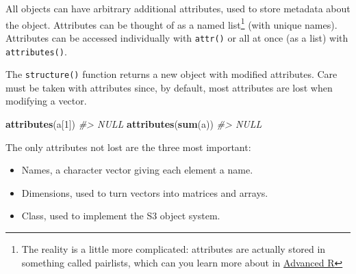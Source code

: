 \documentclass[]{book}
\newenvironment{Shaded}{\begin{snugshade}}{\end{snugshade}}
\newcommand{\KeywordTok}[1]{\textcolor[rgb]{0.13,0.29,0.53}{\textbf{#1}}}
\newcommand{\DecValTok}[1]{\textcolor[rgb]{0.00,0.00,0.81}{#1}}
\newcommand{\StringTok}[1]{\textcolor[rgb]{0.31,0.60,0.02}{#1}}
\newcommand{\CommentTok}[1]{\textcolor[rgb]{0.56,0.35,0.01}{\textit{#1}}}
\newcommand{\OperatorTok}[1]{\textcolor[rgb]{0.81,0.36,0.00}{\textbf{#1}}}
\newcommand{\NormalTok}[1]{#1}
\let\rmarkdownfootnote\footnote%
\def\footnote{\protect\rmarkdownfootnote}
\theoremstyle{definition}
\theoremstyle{definition}
\theoremstyle{definition}
\theoremstyle{remark}
\begin{document}
All objects can have arbitrary additional attributes, used to store
metadata about the object. Attributes can be thought of as a named
list\footnote{The reality is a little more complicated: attributes are
  actually stored in something called pairlists, which can you learn
  more about in \href{http://adv-r.had.co.nz}{Advanced R}} (with unique
names). Attributes can be accessed individually with \texttt{attr()} or
all at once (as a list) with \texttt{attributes()}.

\begin{Shaded}
\end{Shaded}

The \texttt{structure()} function returns a new object with modified
attributes. Care must be taken with attributes since, by default, most
attributes are lost when modifying a vector.

\begin{Shaded}
\begin{Highlighting}[]
\KeywordTok{attributes}\NormalTok{(a[}\DecValTok{1}\NormalTok{])}
\CommentTok{#> NULL}
\KeywordTok{attributes}\NormalTok{(}\KeywordTok{sum}\NormalTok{(a))}
\CommentTok{#> NULL}
\end{Highlighting}
\end{Shaded}

The only attributes not lost are the three most important:

\begin{itemize}
\item
  Names, a character vector giving each element a name.
\item
  Dimensions, used to turn vectors into matrices and arrays.
\item
  Class, used to implement the S3 object system.
\end{itemize}
\end{document}
